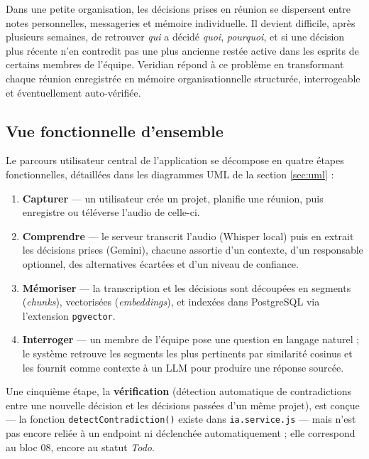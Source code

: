 \documentclass[12pt, a4paper]{article}
\begin{document}
Dans une petite organisation, les décisions prises en réunion se dispersent entre notes personnelles, messageries et mémoire individuelle. Il devient difficile, après plusieurs semaines, de retrouver \emph{qui} a décidé \emph{quoi}, \emph{pourquoi}, et si une décision plus récente n'en contredit pas une plus ancienne restée active dans les esprits de certains membres de l'équipe. Veridian répond à ce problème en transformant chaque réunion enregistrée en mémoire organisationnelle structurée, interrogeable et éventuellement auto-vérifiée.

\subsection{Vue fonctionnelle d'ensemble}

Le parcours utilisateur central de l'application se décompose en quatre étapes fonctionnelles, détaillées dans les diagrammes UML de la section \ref{sec:uml} :

\begin{enumerate}
  \item \textbf{Capturer} — un utilisateur crée un projet, planifie une réunion, puis enregistre ou téléverse l'audio de celle-ci.
  \item \textbf{Comprendre} — le serveur transcrit l'audio (Whisper local) puis en extrait les décisions prises (Gemini), chacune assortie d'un contexte, d'un responsable optionnel, des alternatives écartées et d'un niveau de confiance.
  \item \textbf{Mémoriser} — la transcription et les décisions sont découpées en segments (\textit{chunks}), vectorisées (\textit{embeddings}), et indexées dans PostgreSQL via l'extension \texttt{pgvector}.
  \item \textbf{Interroger} — un membre de l'équipe pose une question en langage naturel ; le système retrouve les segments les plus pertinents par similarité cosinus et les fournit comme contexte à un LLM pour produire une réponse sourcée.
\end{enumerate}

Une cinquième étape, la \textbf{vérification} (détection automatique de contradictions entre une nouvelle décision et les décisions passées d'un même projet), est conçue — la fonction \texttt{detectContradiction()} existe dans \texttt{ia.service.js} — mais n'est pas encore reliée à un endpoint ni déclenchée automatiquement ; elle correspond au bloc 08, encore au statut \textit{Todo}.

\end{document}
